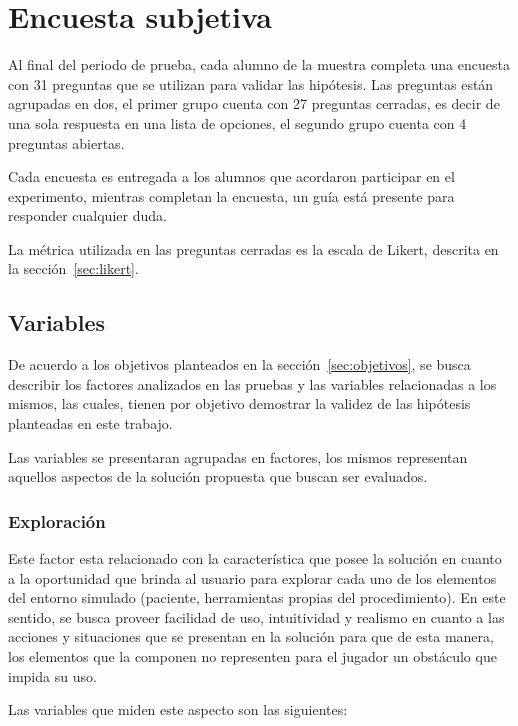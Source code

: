 \section{Encuesta subjetiva}
\label{sec:subjetiva}

Al final del periodo de prueba, cada alumno de la muestra completa una encuesta
con 31 preguntas que se utilizan para validar las hipótesis. Las preguntas están
agrupadas en dos, el primer grupo cuenta con 27 preguntas cerradas, es decir de
una sola respuesta en una lista de opciones, el segundo grupo cuenta con 4
preguntas abiertas. 

Cada encuesta es entregada a los alumnos que acordaron participar en el
experimento, mientras completan la encuesta, un guía está presente para
responder cualquier duda.

La métrica utilizada en las preguntas cerradas es la escala de Likert, descrita
en la sección~\ref{sec:likert}.

\subsection{Variables}
\label{sec:variables}

De acuerdo a los objetivos planteados en la sección~\ref{sec:objetivos}, se
busca describir los factores analizados en las pruebas y las variables
relacionadas a los mismos, las cuales, tienen por objetivo demostrar la validez
de las hipótesis planteadas en este trabajo.

Las variables se presentaran agrupadas en factores, los mismos representan
aquellos aspectos de la solución propuesta que buscan ser evaluados.

\subsubsection{Exploración}
\label{sec:sub_exploracion}

Este factor esta relacionado con la característica que posee la solución en
cuanto a la oportunidad que brinda al usuario para explorar cada uno de los
elementos del entorno simulado (paciente, herramientas propias del
procedimiento). En este sentido, se busca proveer facilidad de uso, intuitividad
y realismo en cuanto a las acciones y situaciones que se presentan en la
solución para que de esta manera, los elementos que la componen no representen
para el jugador un obstáculo que impida su uso.

Las variables que miden este aspecto son las siguientes:

